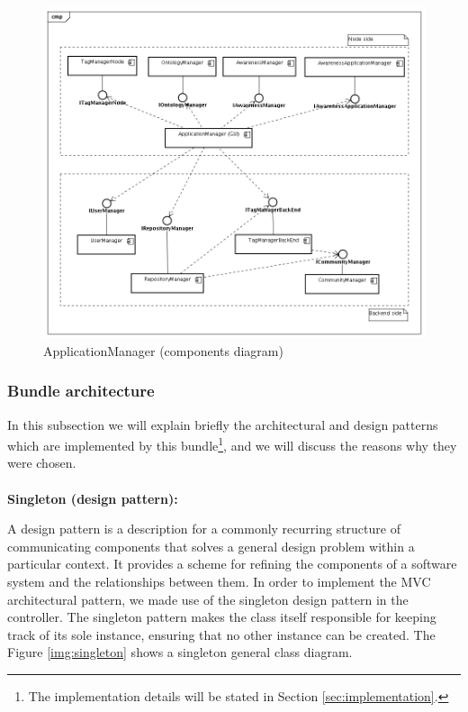 \begin{figure}[h!]
 \begin{center}
 \includegraphics[scale=0.4]{diagrams/ApplicationManagerComponentsDiagram.png}
  \caption{\label{img:am-components}ApplicationManager (components diagram)}
 \end{center}
\end{figure}

\subsubsection{Bundle architecture}
\label{subsub:am-bundle-arch}
In this subsection we will explain briefly the architectural and design
patterns which are implemented by this bundle\footnote{The implementation
details will be stated in Section \ref{sec:implementation}.}, and we will
discuss the reasons why they were chosen.


\paragraph{}

\textbf{Singleton (design pattern):}\newline

A design pattern is a description for a commonly recurring structure of communicating
components that solves a general design problem within a
particular context. It provides a scheme for refining the 
components of a software system and the relationships between them.
\newline
In order to implement the MVC architectural pattern, we made use of the
singleton design pattern in the controller. The singleton pattern makes the
class itself responsible for keeping track of its sole instance, ensuring that
no other instance can be created.
\newline
The Figure \ref{img:singleton} shows a singleton general class diagram.


